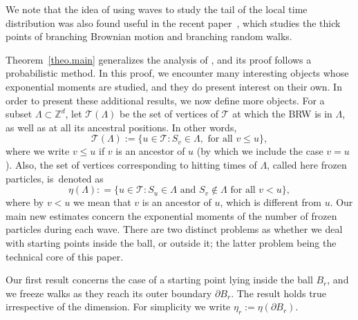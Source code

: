 \documentclass[11pt]{article}
\numberwithin{equation}{section}
\theoremstyle{plain}
\theoremstyle{definition}
\newcommand\Z{\mathbb{Z}}
\newcommand{\1}{{\text{\Large $\mathfrak 1$}}}
\begin{document}
We note that the idea of using waves to study the tail of the local time distribution was also found useful in the recent paper~\cite{BHJ23}, which studies the thick points of branching Brownian motion and branching random walks.

Theorem~\ref{theo.main} generalizes the analysis of \cite{AHJ},
and its proof follows a probabilistic method. In this proof, we
encounter many interesting objects whose exponential moments
are studied, and they do present interest on their own.
In order to present these additional results, we now define more objects.
For a subset $\Lambda\subset \Z^d$, let $\mathcal T(\Lambda)$
be the set of vertices of $\mathcal T$ at which the BRW is in $\Lambda$, as well as at all its ancestral positions. In other words,
\begin{equation}\label{def.Tr}
\mathbf {\mathcal T}(\Lambda) :=
\big\{u\in \mathbf{\mathcal T}: S_v\in \Lambda, \text{ for all }v\le u\},
\end{equation}
where we write $v\le u$ if $v$ is an ancestor of $u$ (by which we include the case $v=u$).
Also, the set of vertices corresponding to hitting times of $\Lambda$, called here frozen particles, is~denoted as
\begin{equation}\label{etar}
\eta(\Lambda) : = \big\{u\in \mathbf {\mathcal T}: S_u \in \Lambda
\text{ and }S_v \notin \Lambda \text{ for all }v< u\},
\end{equation}
where by $v<u$ we mean that $v$ is an ancestor of $u$, which is different from $u$.
Our main new estimates concern the exponential moments of the
number of frozen particles during each wave. There are two distinct
problems as whether we deal with starting points inside the ball, or outside it;
the latter problem being the technical core of this paper.

Our first result concerns the case of a starting point
lying inside the ball $B_r$, and
we freeze walks as they reach its outer boundary $\partial B_r$. The result holds true irrespective of the dimension.
For simplicity we write $\eta_r:=\eta(\partial B_r)$.
\end{document}
